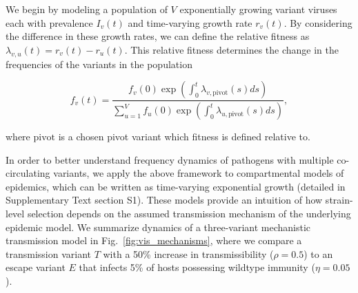 \documentclass[11pt,oneside,letterpaper]{article}
\newcommand{\varEscape}{\eta}
\newcommand{\varTransmission}{\rho}
\begin{document}
We begin by modeling a population of $V$ exponentially growing variant viruses each with prevalence $I_v(t)$ and time-varying growth rate $r_v(t)$.
By considering the difference in these growth rates, we can define the relative fitness as $\lambda_{v, u}(t) = r_v(t) - r_u(t)$.
This relative fitness determines the change in the frequencies of the variants in the population

\begin{equation}
    f_v(t) = \frac{f_v(0) \exp \left( \int_0^t \lambda_{v, \text{pivot}}(s)ds \right)}{ \sum_{u=1}^{V} f_u(0) \exp \left( \int_0^t \lambda_{u, \text{pivot}}(s)ds \right)},
\end{equation}

where $\text{pivot}$ is a chosen pivot variant which fitness is defined relative to.

In order to better understand frequency dynamics of pathogens with multiple co-circulating variants, we apply the above framework to compartmental models of epidemics, which can be written as time-varying exponential growth (detailed in Supplementary Text section S1).
These models provide an intuition of how strain-level selection depends on the assumed transmission mechanism of the underlying epidemic model.
We summarize dynamics of a three-variant mechanistic transmission model in Fig.~\ref{fig:vis_mechanisms}, where we compare a transmission variant $T$ with a 50\% increase in transmissibility ($\varTransmission=0.5$) to an escape variant $E$ that infects 5\% of hosts possessing wildtype immunity ($\varEscape=0.05$).
\end{document}
